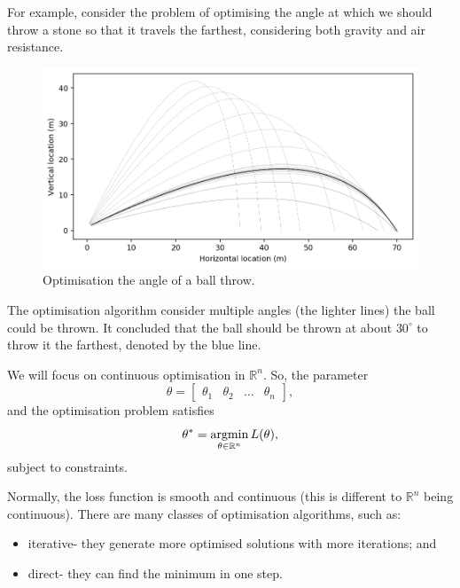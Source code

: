 \documentclass[a4paper, openany]{memoir}
\begin{document}
For example, consider the problem of optimising the angle at which we should throw a stone so that it travels the farthest, considering both gravity and air resistance.
\begin{figure}[H]
    \centering
    \includegraphics[scale=0.6]{src/4.1 ball optimisation.png}
    \caption{Optimisation the angle of a ball throw.}
\end{figure}
\noindent The optimisation algorithm consider multiple angles (the lighter lines) the ball could be thrown. It concluded that the ball should be thrown at about $30^{\circ}$ to throw it the farthest, denoted by the blue line.

We will focus on continuous optimisation in $\mathbb{R}^n$. So, the parameter
\[\theta = \begin{bmatrix}
    \theta_1 & \theta_2 & \dots & \theta_n
\end{bmatrix},\]
and the optimisation problem satisfies
\[\theta^* = \operatornamewithlimits{arg min}_{\theta \in \mathbb{R}^n} L(\theta),\]
subject to constraints.

Normally, the loss function is smooth and continuous (this is different to $\mathbb{R}^n$ being continuous). There are many classes of optimisation algorithms, such as:
\begin{itemize}
    \item iterative- they generate more optimised solutions with more iterations; and
    \item direct- they can find the minimum in one step.
\end{itemize}
\end{document}
